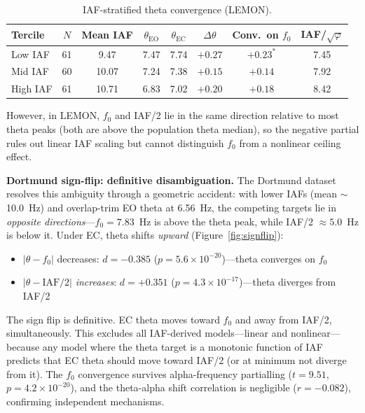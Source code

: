 \documentclass[11pt,a4paper]{article}
\newcommand{\phisym}{\varphi}
\newcommand{\fzero}{f_0}
\begin{document}
\begin{table}[H]
\centering
\caption{IAF-stratified theta convergence (LEMON).}
\label{tab:iaf_tercile}
\begin{tabular}{lccccccc}
\toprule
Tercile & $N$ & Mean IAF & $\theta_{\text{EO}}$ & $\theta_{\text{EC}}$ & $\Delta\theta$ & Conv.\ on $\fzero$ & IAF/$\sqrt{\phisym}$ \\
\midrule
Low IAF & 61 & 9.47 & 7.47 & 7.74 & $+0.27$ & $+0.23^*$ & 7.45 \\
Mid IAF & 60 & 10.07 & 7.24 & 7.38 & $+0.15$ & $+0.14$ & 7.92 \\
High IAF & 61 & 10.71 & 6.83 & 7.02 & $+0.20$ & $+0.18$ & 8.42 \\
\bottomrule
\end{tabular}
\end{table}

However, in LEMON, $\fzero$ and IAF/2 lie in the same direction relative to most theta peaks (both are above the population theta median), so the negative partial rules out linear IAF scaling but cannot distinguish $\fzero$ from a nonlinear ceiling effect.

\textbf{Dortmund sign-flip: definitive disambiguation.} The Dortmund dataset resolves this ambiguity through a geometric accident: with lower IAFs (mean $\sim$10.0~Hz) and overlap-trim EO theta at 6.56~Hz, the competing targets lie in \textit{opposite directions}---$\fzero = 7.83$~Hz is above the theta peak, while IAF/2 $\approx 5.0$~Hz is below it. Under EC, theta shifts \textit{upward} (Figure~\ref{fig:signflip}):

\begin{itemize}
    \item $|\theta - \fzero|$ decreases: $d = -0.385$ ($p = 5.6 \times 10^{-20}$)---theta converges on $\fzero$
    \item $|\theta - \text{IAF}/2|$ \textit{increases}: $d = +0.351$ ($p = 4.3 \times 10^{-17}$)---theta diverges from IAF/2
\end{itemize}

The sign flip is definitive. EC theta moves toward $\fzero$ and away from IAF/2, simultaneously. This excludes all IAF-derived models---linear and nonlinear---because any model where the theta target is a monotonic function of IAF predicts that EC theta should move toward IAF/2 (or at minimum not diverge from it). The $\fzero$ convergence survives alpha-frequency partialling ($t = 9.51$, $p = 4.2 \times 10^{-20}$), and the theta-alpha shift correlation is negligible ($r = -0.082$), confirming independent mechanisms.
\end{document}
